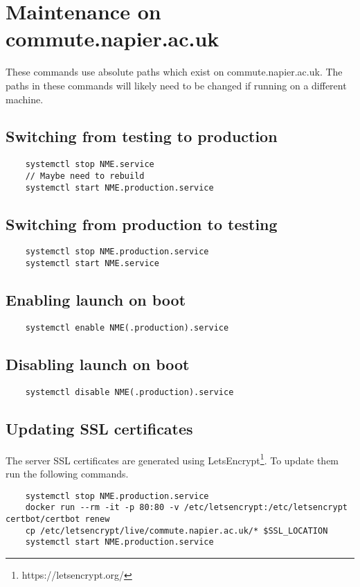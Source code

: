 \section{Maintenance on commute.napier.ac.uk}

These commands use absolute paths which exist on commute.napier.ac.uk. The paths in these commands will likely need to be changed if running on a different machine.

\subsection{Switching from testing to production}

\begin{verbatim}
	systemctl stop NME.service
	// Maybe need to rebuild
	systemctl start NME.production.service
\end{verbatim}

\subsection{Switching from production to testing}

\begin{verbatim}
	systemctl stop NME.production.service
	systemctl start NME.service
\end{verbatim}

\subsection{Enabling launch on boot}

\begin{verbatim}
	systemctl enable NME(.production).service
\end{verbatim}

\subsection{Disabling launch on boot}

\begin{verbatim}
	systemctl disable NME(.production).service
\end{verbatim}

\subsection{Updating SSL certificates}

The server SSL certificates are generated using LetsEncrypt\footnote{https://letsencrypt.org/}. To update them run the following commands.

\begin{verbatim}
	systemctl stop NME.production.service
	docker run --rm -it -p 80:80 -v /etc/letsencrypt:/etc/letsencrypt certbot/certbot renew
	cp /etc/letsencrypt/live/commute.napier.ac.uk/* $SSL_LOCATION
	systemctl start NME.production.service
\end{verbatim}
